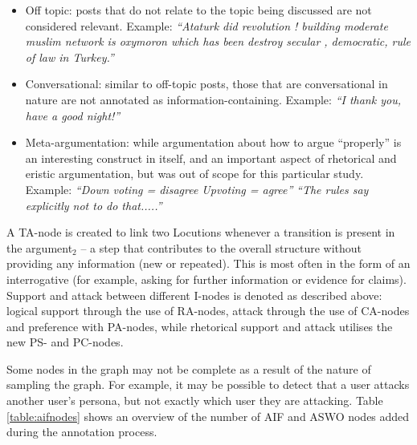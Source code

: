 \begin{itemize}
	\item Off topic: posts that do not relate to the topic being discussed are not considered relevant. Example: \textit{``Ataturk did revolution ! building moderate muslim network is oxymoron which has been destroy secular , democratic, rule of law in Turkey.''}
	\item Conversational: similar to off-topic posts, those that are conversational in nature are not annotated as information-containing. Example: \textit{``I thank you, have a good night!''}
	\item Meta-argumentation: while argumentation about how to argue ``properly'' is an interesting construct in itself, and an important aspect of rhetorical and eristic argumentation, but was out of scope for this particular study. Example: \textit{``Down voting = disagree Upvoting = agree''} \textit{``The rules say explicitly not to do that.....''}
\end{itemize}

A TA-node is created to link two Locutions whenever a transition is present in the argument$_2$ -- a step that contributes to the overall structure without providing any information (new or repeated). This is most often in the form of an interrogative (for example, asking for further information or evidence for claims). Support and attack between different I-nodes is denoted as described above: logical support through the use of RA-nodes, attack through the use of CA-nodes and preference with PA-nodes, while rhetorical support and attack utilises the new PS- and PC-nodes.

Some nodes in the graph may not be complete as a result of the nature of sampling the graph. For example, it may be possible to detect that a user attacks another user's persona, but not exactly which user they are attacking. Table \ref{table:aifnodes} shows an overview of the number of AIF and ASWO nodes added during the annotation process.

